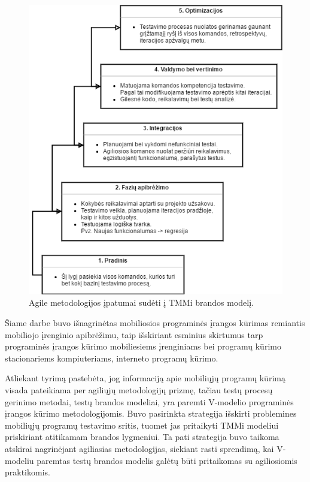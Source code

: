 \documentclass{VUMIFPSkursinis}
\begin{document}
\begin{figure}[H]
    \centering
    \includegraphics[scale=0.85]{img/Tmmagile}
    \caption{Agile metodologijos įpatumai sudėti į TMMi brandos modelį.}
    \label{img:tmmiagile}
\end{figure}

Šiame darbe buvo išnagrinėtas mobiliosios programinės įrangos kūrimas remiantis mobiliojo įrenginio apibrėžimu, taip išskiriant esminius skirtumus tarp programinės įrangos kūrimo mobiliesiems įrenginiams bei programų kūrimo stacionariems kompiuteriams, interneto programų kūrimo.

Atliekant tyrimą pastebėta, jog informaciją apie mobiliųjų programų kūrimą visada pateikiama per agiliųjų metodologijų prizmę, tačiau testų procesų gerinimo metodai, testų brandos modeliai, yra paremti V-modelio programinės įrangos kūrimo metodologijomis. Buvo pasirinkta strategija išskirti problemines mobiliųjų programų testavimo sritis, tuomet jas pritaikyti TMMi modeliui priskiriant atitikamam brandos lygmeniui. Ta pati strategija buvo taikoma atskirai nagrinėjant agiliasias metodologijas, siekiant rasti sprendimą, kai V-modeliu paremtas testų brandos modelis galėtų būti pritaikomas su agiliosiomis praktikomis.
\end{document}

